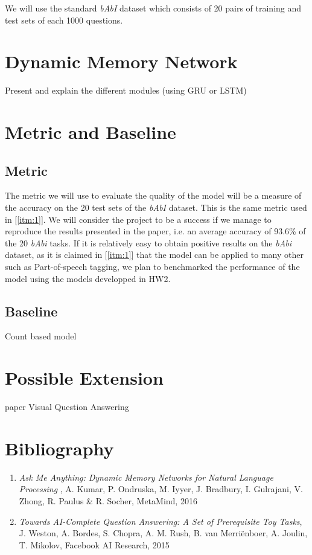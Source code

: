 \documentclass[submit]{harvardml}
\begin{document}
We will use the standard \emph{bAbI} dataset which consists of 20 pairs of training and test sets of each 1000 questions.

\section{Dynamic Memory Network}

Present and explain the different modules (using GRU or LSTM)

\section{Metric and Baseline}

\subsection{Metric}
The metric we will use to evaluate the quality of the model will be a measure of the accuracy on the 20 test sets of the \emph{bAbI} dataset. This is the same metric used in [\ref{itm:1}]. We will consider the project to be a success if we manage to reproduce the results presented in the paper, i.e. an average accuracy of 93.6\% of the 20 \emph{bAbi} tasks. If it is relatively easy to obtain positive results on the \emph{bAbi} dataset, as it is claimed in [\ref{itm:1}] that the model can be applied to many other such as Part-of-speech tagging, we plan to benchmarked the performance of the model using the models developped in HW2.

\subsection{Baseline}

Count based model

\section{Possible Extension}
paper Visual Question Answering

\section{Bibliography}
\begin{enumerate}
	\item \emph{Ask Me Anything:
Dynamic Memory Networks for Natural Language Processing
}, A. Kumar, P. Ondruska, M. Iyyer, J. Bradbury, I. Gulrajani, V. Zhong, R. Paulus \& R. Socher, MetaMind, 2016 \label{itm:1}

	\item \emph{Towards AI-Complete Question Answering: A Set of Prerequisite Toy Tasks}, J. Weston, A. Bordes, S. Chopra, A. M. Rush, B. van Merriënboer, A. Joulin, T. Mikolov, Facebook  AI Research, 2015 \label{item:2}
	
\end{enumerate}
\end{document}
